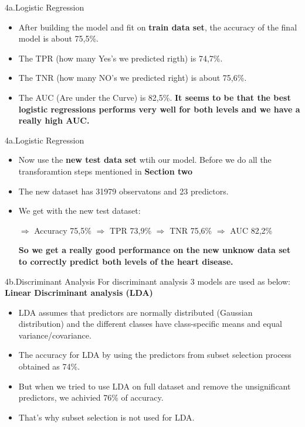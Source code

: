 \documentclass[xcolor=dvipsnames]{beamer}
\begin{document}
\begin{frame}{4a.Logistic Regression}
\begin{itemize}
\item After building the model and fit on \textbf{train data set}, the accuracy of the final model is about 75,5\%.
\item  The TPR (how many Yes's we predicted rigth) is 74,7\%. 
\item The TNR (how many NO's we predicted right) is about 75,6\%.
\item The AUC (Are under the Curve) is 82,5\%.
\newline \textbf{It seems to be that the best logistic regressions performs very well for both levels and we have a really high AUC.}
\end{itemize}
\end{frame}

\begin{frame}{4a.Logistic Regression}
\begin{itemize}
\item Now use the \textbf{new test data set} wtih our model. Before we do all the transforamtion steps mentioned in \textbf{Section two}
\item The new dataset has 31979 observatons and 23 predictors.
\item We get with the new test dataset:
\begin{itemize}
$\Rightarrow$ Accuracy 75,5\%
\newline $\Rightarrow$ TPR 73,9\%
\newline $\Rightarrow$ TNR 75,6\%
\newline $\Rightarrow$ AUC 82,2\%
\end{itemize}
\textbf{So we get a really good performance on the new unknow data set to correctly predict both levels of the heart disease.}
\end{itemize}
\end{frame}

\begin{frame}{4b.Discriminant Analysis}
For discriminant analysis 3 models are used as below:
\newline \textbf{Linear Discriminant analysis (LDA)}
\begin{itemize}
\item LDA assumes that predictors are normally distributed  (Gaussian distribution) and the different classes have class-specific means and equal variance/covariance.
\item The accuracy for LDA by using the predictors from subset selection  process obtained as 74\%.
\item But when we tried to use LDA on full dataset and remove the unsignificant predictors, we achivied 76\% of accuracy.
\item That's why subset selection is not used for LDA.
\end{itemize}
\end{frame}
\end{document}
